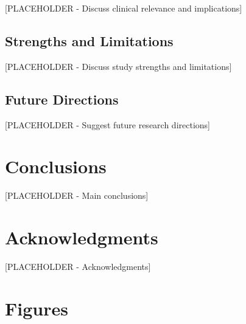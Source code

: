 \documentclass[12pt]{article}
\begin{document}
[PLACEHOLDER - Discuss clinical relevance and implications]

\subsection{Strengths and Limitations}

[PLACEHOLDER - Discuss study strengths and limitations]

\subsection{Future Directions}

[PLACEHOLDER - Suggest future research directions]

\newpage

\section{Conclusions}

[PLACEHOLDER - Main conclusions]

\newpage

\section*{Acknowledgments}

[PLACEHOLDER - Acknowledgments]

\newpage





\newpage

\section*{Figures}
\end{document}
